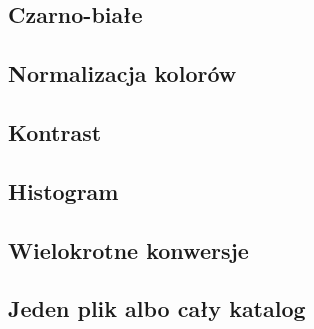 \documentclass[oneside,11pt,sfheadings]{mwart}
\begin{document}
\subsection{Czarno-białe}
\subsection{Normalizacja kolorów}
\subsection{Kontrast}
\subsection{Histogram}
\subsection{Wielokrotne konwersje}
\subsection{Jeden plik albo cały katalog}
\end{document}
